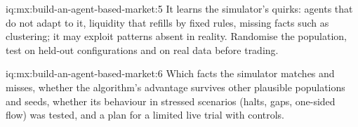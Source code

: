 \begin{solution}{iq:mx:build-an-agent-based-market:5}
It learns the simulator's quirks: agents that do not adapt to it, liquidity that refills by fixed rules, missing facts such as clustering; it may
exploit patterns absent in reality. Randomise the population, test on held-out configurations and on real data before trading.
\end{solution}

\begin{solution}{iq:mx:build-an-agent-based-market:6}
Which facts the simulator matches and misses, whether the algorithm's advantage survives other plausible populations and seeds, whether its behaviour
in stressed scenarios (halts, gaps, one-sided flow) was tested, and a plan for a limited live trial with controls.
\end{solution}
